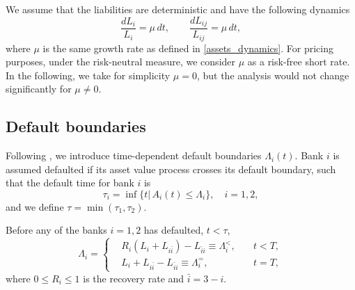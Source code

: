 We assume that the liabilities are deterministic and have the following dynamics
\begin{equation}
	\frac{d L_i}{L_i} = \mu \, d t, \qquad \frac{d L_{ij}}{L_{ij}} = \mu \, d t,
\end{equation}
where $\mu$ is the same growth rate as defined in \eqref{assets_dynamics}. For pricing purposes, under the risk-neutral measure, we consider $\mu$ as a risk-free short rate. In the following, we take for simplicity $\mu = 0$, but the analysis would not change significantly for $\mu\neq 0$.
\subsection{Default boundaries}

Following \cite{Lipton2015}, we introduce time-dependent default boundaries $\Lambda_i(t)$. 
Bank $i$ is assumed defaulted if its asset value process crosses its default boundary, such that the default time for bank $i$ is
\begin{equation}
	\tau_i = \inf\{t |\, A_i(t) \le \Lambda_i\}, \quad i = 1, 2,
\end{equation}
and we define $\tau = \min(\tau_1, \tau_2)$.



Before any of the banks $i=1,2$ has defaulted, $t<\tau$, 
\begin{equation}
	\Lambda_i = \left\{
	\begin{aligned}
	& R_i (L_i + L_{i \bar{i}}) - L_{\bar{i} i} \equiv \Lambda_i^{<},  \quad & t < T, \\
	&  L_i + L_{i \bar{i}} - L_{\bar{i} i}  \equiv \Lambda_i^{=},  & t = T,
	\end{aligned}
	\right.
\end{equation}
where $0 \le R_i \le 1$ is the recovery rate and $\bar{i} = 3 - i$.


